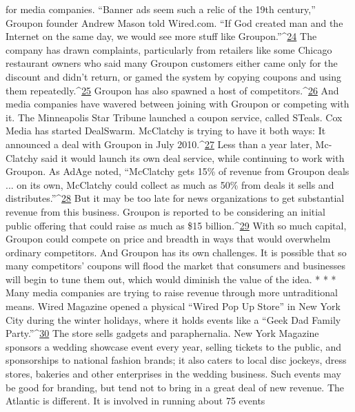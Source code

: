 for media companies. ``Banner ads seem such a relic of the 19th century,''
Groupon founder Andrew Mason told Wired.com. ``If God created man and the
Internet on the same day, we would see more stuff like Groupon.''^{\href{#endnotes-ch8}{24}}
The company has drawn complaints, particularly from retailers like some Chicago
restaurant owners who said many Groupon customers either came only for
the discount and didn’t return, or gamed the system by copying coupons and
using them repeatedly.^{\href{#endnotes-ch8}{25}} Groupon has also spawned a host of competitors.^{\href{#endnotes-ch8}{26}} And
media companies have wavered between joining with Groupon or competing
with it.
The Minneapolis Star Tribune launched a coupon service, called STeals.
Cox Media has started DealSwarm. McClatchy is trying to have it both ways:
It announced a deal with Groupon in July 2010.^{\href{#endnotes-ch8}{27}} Less than a year later, Mc-
Clatchy said it would launch its own deal service, while continuing to work
with Groupon. As AdAge noted, ``McClatchy gets 15\% of revenue from Groupon
deals ... on its own, McClatchy could collect as much as 50\% from deals
it sells and distributes.''^{\href{#endnotes-ch8}{28}}
But it may be too late for news organizations to get substantial revenue from
this business. Groupon is reported to be considering an initial public offering
that could raise as much as \$15 billion.^{\href{#endnotes-ch8}{29}} With so much capital, Groupon could
compete on price and breadth in ways that would overwhelm ordinary competitors.
And Groupon has its own challenges. It is possible that so many competitors’
coupons will flood the market that consumers and businesses will begin to tune
them out, which would diminish the value of the idea.
* * *
Many media companies are trying to raise revenue through more untraditional
means. Wired Magazine opened a physical ``Wired Pop Up Store'' in New York
City during the winter holidays, where it holds events like a ``Geek Dad Family
Party.''^{\href{#endnotes-ch8}{30}} The store sells gadgets and paraphernalia. New York Magazine sponsors a
wedding showcase event every year, selling tickets to the public, and sponsorships
to national fashion brands; it also caters to local disc jockeys, dress stores, bakeries
and other enterprises in the wedding business.
Such events may be good for branding, but tend not to bring in a great deal of
new revenue. The Atlantic is different. It is involved in running about 75 events

